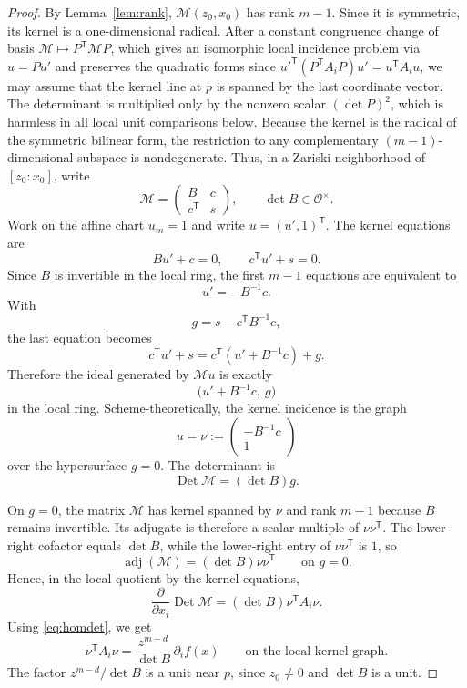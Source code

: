 \documentclass[11pt]{article}
\theoremstyle{plain}
\theoremstyle{definition}
\DeclareMathOperator{\adj}{adj}
\DeclareMathOperator{\Det}{Det}
\newcommand{\OO}{\mathcal O}
\newcommand{\Mcal}{\mathcal M}
\begin{document}
\begin{proof}
By Lemma~\ref{lem:rank}, $\Mcal(z_0,x_0)$ has rank $m-1$.  Since it is
symmetric, its kernel is a one-dimensional radical.  After a constant congruence
change of basis $\Mcal\mapsto P^{\mathsf T}\Mcal P$, which gives an
isomorphic local incidence problem via $u=P u'$ and preserves the quadratic
forms since ${u'}^{\mathsf T}(P^{\mathsf T}A_iP)u'=u^{\mathsf T}A_i u$, we
may assume that the kernel line at $p$ is spanned by the last coordinate vector.
The determinant is multiplied only by the nonzero scalar $(\det P)^2$, which is
harmless in all local unit comparisons below.  Because the kernel is the radical
of the symmetric bilinear form, the restriction to any complementary
$(m-1)$-dimensional subspace is nondegenerate.  Thus, in a Zariski neighborhood
of $[z_0:x_0]$, write
\[
  \Mcal=\begin{pmatrix}B&c\\ c^{\mathsf T}&s\end{pmatrix},
  \qquad \det B\in\OO^\times.
\]
Work on the affine chart $u_m=1$ and write $u=(u',1)^{\mathsf T}$.  The kernel
equations are
\[
  Bu'+c=0,
  \qquad
  c^{\mathsf T}u'+s=0.
\]
Since $B$ is invertible in the local ring, the first $m-1$ equations are
equivalent to
\[
  u'=-B^{-1}c.
\]
With
\[
  g=s-c^{\mathsf T}B^{-1}c,
\]
the last equation becomes
\[
  c^{\mathsf T}u'+s
  =c^{\mathsf T}(u'+B^{-1}c)+g.
\]
Therefore the ideal generated by $\Mcal u$ is exactly
\[
  \big(u'+B^{-1}c,\ g\big)
\]
in the local ring.  Scheme-theoretically, the kernel incidence is the graph
\[
  u=\nu:=\begin{pmatrix}-B^{-1}c\\1\end{pmatrix}
\]
over the hypersurface $g=0$.  The determinant is
\begin{equation}
\label{eq:schurdet}
  \Det\Mcal=(\det B)g.
\end{equation}

On $g=0$, the matrix $\Mcal$ has kernel spanned by $\nu$ and rank $m-1$ because
$B$ remains invertible.  Its adjugate is therefore a scalar multiple of
$\nu\nu^{\mathsf T}$.  The lower-right cofactor equals $\det B$, while the
lower-right entry of $\nu\nu^{\mathsf T}$ is $1$, so
\begin{equation}
\label{eq:adjlocal}
  \adj(\Mcal)=(\det B)\nu\nu^{\mathsf T}
  \qquad\text{on }g=0.
\end{equation}
Hence, in the local quotient by the kernel equations,
\[
  \frac{\partial}{\partial x_i}\Det\Mcal
  =(\det B)\nu^{\mathsf T}A_i\nu.
\]
Using \eqref{eq:homdet}, we get
\begin{equation}
\label{eq:unitpolar}
  \nu^{\mathsf T}A_i\nu
  =\frac{z^{m-d}}{\det B}\,\partial_i f(x)
  \qquad\text{on the local kernel graph.}
\end{equation}
The factor $z^{m-d}/\det B$ is a unit near $p$, since $z_0\ne0$ and
$\det B$ is a unit.


\end{proof}
\end{document}

